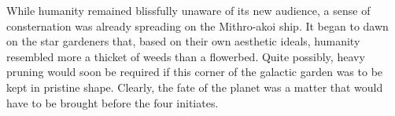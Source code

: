 \documentclass[12pt]{article}
\begin{document}
While humanity remained blissfully unaware of its new audience,
a sense of consternation was already spreading on the Mithro-akoi ship.
It began to dawn on the star gardeners that,
based on their own aesthetic ideals,
humanity resembled more a thicket of weeds than a flowerbed.
Quite possibly, heavy pruning would soon be required if this corner of the galactic garden was to be kept in pristine shape.
Clearly, the fate of the planet was a matter that would have to be brought before the four initiates.
\end{document}

